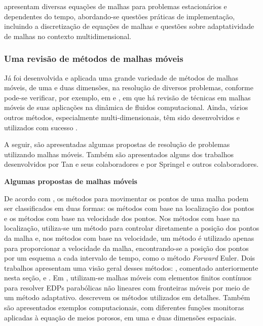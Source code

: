  apresentam diversas equações de malhas para problemas estacionários e dependentes do tempo, abordando-se questões práticas de implementação, incluindo a discretização de equações de malhas e questões sobre adaptatividade de malhas no contexto multidimensional.

\subsubsection{Uma revisão de métodos de malhas móveis}
\label{cap_revisao_metodos_malhas_moveis}

Já foi desenvolvida e aplicada uma grande variedade de métodos de malhas móveis, de uma e duas dimensões, na resolução de diversos problemas, conforme pode-se verificar, por exemplo, em  e , em que há revisão de técnicas em malhas móveis de suas aplicações na dinâmica de fluidos computacional. Ainda, vários outros métodos, especialmente multi-dimensionais, têm sido desenvolvidos e utilizados com sucesso \cite{Tan2004, Tan2006, Springel2009, Springel2011}.

A seguir, são apresentadas algumas propostas de resolução de problemas utilizando malhas móveis. Também são apresentados alguns dos trabalhos desenvolvidos por Tan e seus colaboradores e por Springel e outros colaboradores. 

\textbf{Algumas propostas de malhas móveis}
\label{subcap_algumas_propostas_malhas_moveis}

De acordo com , os métodos para movimentar os pontos de uma malha podem ser classificados em duas formas: os métodos com base na localização dos pontos e os métodos com base na velocidade dos pontos. Nos métodos com base na localização, utiliza-se um método para controlar diretamente a posição dos pontos da malha e, nos métodos com base na velocidade, um método é utilizado apenas para proporcionar a velocidade da malha, encontrando-se a posição dos pontos por um esquema a cada intervalo de tempo, como o método {\it Forward} Euler. Dois trabalhos apresentam uma visão geral desses métodos: , comentado anteriormente nesta seção, e . Em , utilizam-se malhas móveis com elementos finitos contínuos para resolver EDPs parabólicas não lineares com fronteiras móveis por meio de um método adaptativo.  descrevem os métodos utilizados em detalhes. Também são apresentados exemplos computacionais, com diferentes funções monitoras aplicadas à equação de meios porosos, em uma e duas dimensões espaciais.

